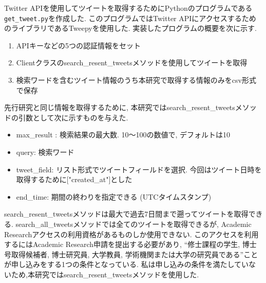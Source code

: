 Twitter APIを使用してツイートを取得するためにPythonのプログラムである\verb|get_tweet.py|を作成した. このプログラムではTwitter APIにアクセスするためのライブラリであるTweepy\cite{tweepy}を使用した. 
実装したプログラムの概要を次に示す.
\begin{enumerate}
  \item APIキーなどの5つの認証情報をセット
  \item Clientクラスのsearch\_resent\_tweetsメソッドを使用してツイートを取得
  \item 検索ワードを含むツイート情報のうち本研究で取得する情報のみをcsv形式で保存
\end{enumerate}
先行研究と同じ情報を取得するために, 本研究ではsearch\_resent\_tweetsメソッドの引数として次に示すものを与えた. 
\begin{itemize}
 \item max\_result : 検索結果の最大数. 10〜100の数値で, デフォルトは10
 \item query: 検索ワード
 \item tweet\_field: リスト形式でツイートフィールドを選択. 今回はツイート日時を取得するために["created\_at"]とした
 \item end\_time: 期間の終わりを指定できる (UTCタイムスタンプ) 
\end{itemize}
search\_resent\_tweetsメソッドは最大で過去7日間まで遡ってツイートを取得できる. search\_all\_tweetsメソッドでは全てのツイートを取得できるが, Academic Researchアクセスの利用資格があるものしか使用できない. このアクセスを利用するにはAcademic Research申請を提出する必要があり, ``修士課程の学生, 博士号取得候補者, 博士研究員, 大学教員, 学術機関または大学の研究員である''ことが申し込みをする1つの条件となっている\cite{academic-research}. 
私は申し込みの条件を満たしていないため,本研究ではsearch\_resent\_tweetsメソッドを使用した. 


